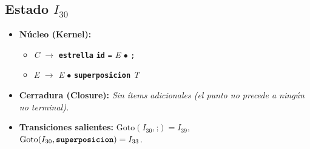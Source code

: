 \documentclass[12pt, letterpaper]{article}
\begin{document}
\subsection*{Estado $I_{30}$ }
\begin{itemize}\setlength{\itemsep}{1pt}\setlength{\parskip}{0pt}
\item \textbf{Núcleo (Kernel):}
\begin{itemize}\setlength{\itemsep}{1pt}\setlength{\parskip}{0pt}
    \item \textit{C} $\to$ \textbf{\texttt{estrella}} \textbf{\texttt{id}} \texttt{=} \textit{E} $\bullet$ \texttt{;}
    \item \textit{E} $\to$ \textit{E} $\bullet$ \textbf{\texttt{superposicion}} \textit{T}
\end{itemize}
\item \textbf{Cerradura (Closure):} \emph{Sin ítems adicionales (el punto no precede a ningún no terminal).}
\item \textbf{Transiciones salientes:} $\text{Goto}(I_{30}, \texttt{;}) = I_{39}$, \quad $\text{Goto}(I_{30}, \textbf{\texttt{superposicion}}) = I_{33}$.
\end{itemize}
\vspace{2pt}
\end{document}
